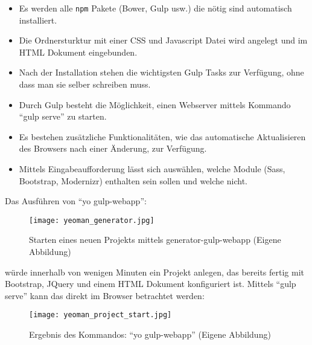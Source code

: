 		\begin{itemize}
			\item Es werden alle \texttt{npm} Pakete (Bower, Gulp usw.) die nötig sind automatisch installiert.
			\item Die Ordnersturktur mit einer CSS und Javascript Datei wird angelegt und im HTML Dokument eingebunden.
			\item Nach der Installation stehen die wichtigsten Gulp Tasks zur Verfügung, ohne dass man sie selber schreiben muss.
			\item Durch Gulp besteht die Möglichkeit, einen Webserver mittels Kommando "`gulp serve"' zu starten.
			\item Es bestehen zusätzliche Funktionalitäten, wie das automatische Aktualisieren des Browsers nach einer Änderung, zur Verfügung.
			\item Mittels Eingabeaufforderung lässt sich auswählen, welche Module (Sass, Bootstrap, Modernizr) enthalten sein sollen und welche nicht.
		\end{itemize}

		Das Ausführen von "`yo gulp-webapp"':
		\begin{figure}[htbp]
			\begin{center}
				\texttt{[image: yeoman\_generator.jpg]}
				\caption{Starten eines neuen Projekts mittels generator-gulp-webapp (Eigene Abbildung)}
				\label{fig:yeoman_generator}
			\end{center}
		\end{figure}

		würde innerhalb von wenigen Minuten ein Projekt anlegen, das bereits fertig mit Bootstrap, JQuery und einem HTML Dokument konfiguriert ist. Mittels "`gulp serve"' kann das direkt im Browser betrachtet werden:

		\begin{figure}[htbp]
			\begin{center}
				\texttt{[image: yeoman\_project\_start.jpg]}
				\caption{Ergebnis des Kommandos: "`yo gulp-webapp"' (Eigene Abbildung)}
				\label{fig:yeoman_project_start}
			\end{center}
		\end{figure}
				
